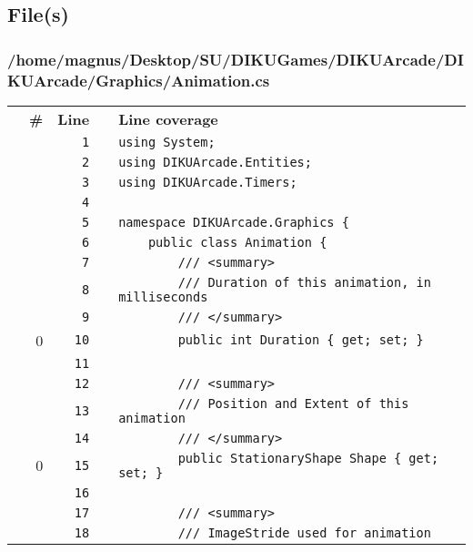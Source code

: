 \documentclass[a4paper,landscape,10pt]{article}
\begin{document}
\subsection{File(s)}
\subsubsection{/home/magnus/Desktop/SU/DIKUGames/DIKUArcade/DIKUArcade/Graphics/Animation.cs}
\begin{longtable}[l]{lrrll}
\textbf{} & \textbf{\#} & \textbf{Line} & \textbf{} & \textbf{Line coverage}\\
\cellcolor{gray} &  & \verb~1~ & & \verb~using System;~\\
\cellcolor{gray} &  & \verb~2~ & & \verb~using DIKUArcade.Entities;~\\
\cellcolor{gray} &  & \verb~3~ & & \verb~using DIKUArcade.Timers;~\\
\cellcolor{gray} &  & \verb~4~ & & \verb~~\\
\cellcolor{gray} &  & \verb~5~ & & \verb~namespace DIKUArcade.Graphics {~\\
\cellcolor{gray} &  & \verb~6~ & & \verb~    public class Animation {~\\
\cellcolor{gray} &  & \verb~7~ & & \verb~        /// <summary>~\\
\cellcolor{gray} &  & \verb~8~ & & \verb~        /// Duration of this animation, in milliseconds~\\
\cellcolor{gray} &  & \verb~9~ & & \verb~        /// </summary>~\\
\cellcolor{red} & 0 & \verb~10~ & & \verb~        public int Duration { get; set; }~\\
\cellcolor{gray} &  & \verb~11~ & & \verb~~\\
\cellcolor{gray} &  & \verb~12~ & & \verb~        /// <summary>~\\
\cellcolor{gray} &  & \verb~13~ & & \verb~        /// Position and Extent of this animation~\\
\cellcolor{gray} &  & \verb~14~ & & \verb~        /// </summary>~\\
\cellcolor{red} & 0 & \verb~15~ & & \verb~        public StationaryShape Shape { get; set; }~\\
\cellcolor{gray} &  & \verb~16~ & & \verb~~\\
\cellcolor{gray} &  & \verb~17~ & & \verb~        /// <summary>~\\
\cellcolor{gray} &  & \verb~18~ & & \verb~        /// ImageStride used for animation~\\

\end{longtable}
\end{document}
